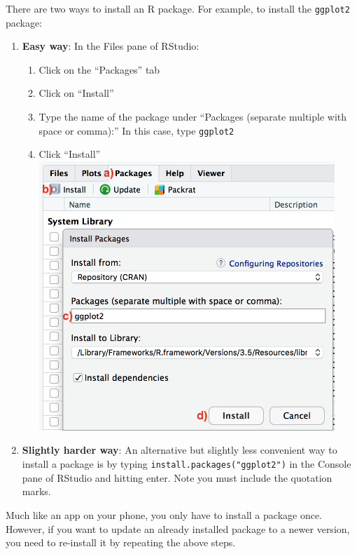 \documentclass[12pt, krantz2,]{krantz}
\providecommand{\tightlist}{%
  \setlength{\itemsep}{0pt}\setlength{\parskip}{0pt}}
\begin{document}
There are two ways to install an R package. For example, to install the \texttt{ggplot2} package:

\begin{enumerate}
\def\labelenumi{\arabic{enumi}.}
\tightlist
\item
  \textbf{Easy way}: In the Files pane of RStudio:

  \begin{enumerate}
  \def\labelenumii{\alph{enumii})}
  \tightlist
  \item
    Click on the ``Packages'' tab
  \item
    Click on ``Install''
  \item
    Type the name of the package under ``Packages (separate multiple with space or comma):'' In this case, type \texttt{ggplot2}
  \item
    Click ``Install''\\
    \includegraphics[width=\textwidth,height=4in]{images/install_packages_easy_way.png}
  \end{enumerate}
\item
  \textbf{Slightly harder way}: An alternative but slightly less convenient way to install a package is by typing \texttt{install.packages("ggplot2")} in the Console pane of RStudio and hitting enter. Note you must include the quotation marks.
\end{enumerate}

Much like an app on your phone, you only have to install a package once. However, if you want to update an already installed package to a newer version, you need to re-install it by repeating the above steps.
\end{document}
